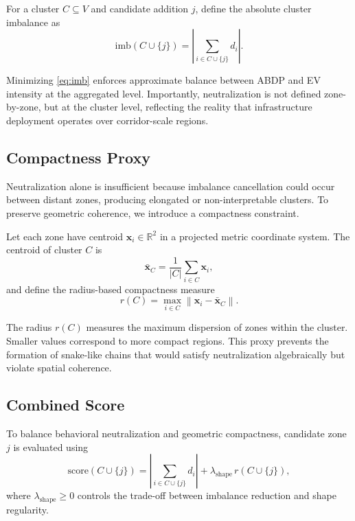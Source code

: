 \documentclass[conference]{IEEEtran}
\begin{document}
For a cluster $C \subseteq V$ and candidate addition $j$,
define the absolute cluster imbalance as
\begin{equation}
\mathrm{imb}(C\cup\{j\}) =
\left|\sum_{i\in C\cup\{j\}} d_i\right|.
\label{eq:imb}
\end{equation}

Minimizing \eqref{eq:imb} enforces approximate balance between
ABDP and EV intensity at the aggregated level. Importantly,
neutralization is not defined zone-by-zone, but at the cluster
level, reflecting the reality that infrastructure deployment
operates over corridor-scale regions.

\subsection{Compactness Proxy}

Neutralization alone is insufficient because imbalance cancellation
could occur between distant zones, producing elongated or
non-interpretable clusters. To preserve geometric coherence, we
introduce a compactness constraint.

Let each zone have centroid $\mathbf{x}_i\in\mathbb{R}^2$
in a projected metric coordinate system. The centroid of cluster $C$
is
\begin{equation}
\bar{\mathbf{x}}_{C} =
\frac{1}{|C|}\sum_{i\in C}\mathbf{x}_i,
\end{equation}
and define the radius-based compactness measure
\begin{equation}
r(C) =
\max_{i\in C}
\left\|
\mathbf{x}_i - \bar{\mathbf{x}}_{C}
\right\|.
\label{eq:radius}
\end{equation}

The radius $r(C)$ measures the maximum dispersion of zones within the
cluster. Smaller values correspond to more compact regions. This proxy prevents the formation of snake-like chains that would satisfy neutralization algebraically but violate spatial
coherence.

\subsection{Combined Score}

To balance behavioral neutralization and geometric compactness,
candidate zone $j$ is evaluated using
\begin{equation}
\mathrm{score}(C\cup\{j\}) =
\left|\sum_{i\in C\cup\{j\}} d_i\right|
+\lambda_{\mathrm{shape}}\,
r(C\cup\{j\}),
\label{eq:score}
\end{equation}
where $\lambda_{\mathrm{shape}}\ge 0$ controls the trade-off between
imbalance reduction and shape regularity.
\end{document}
